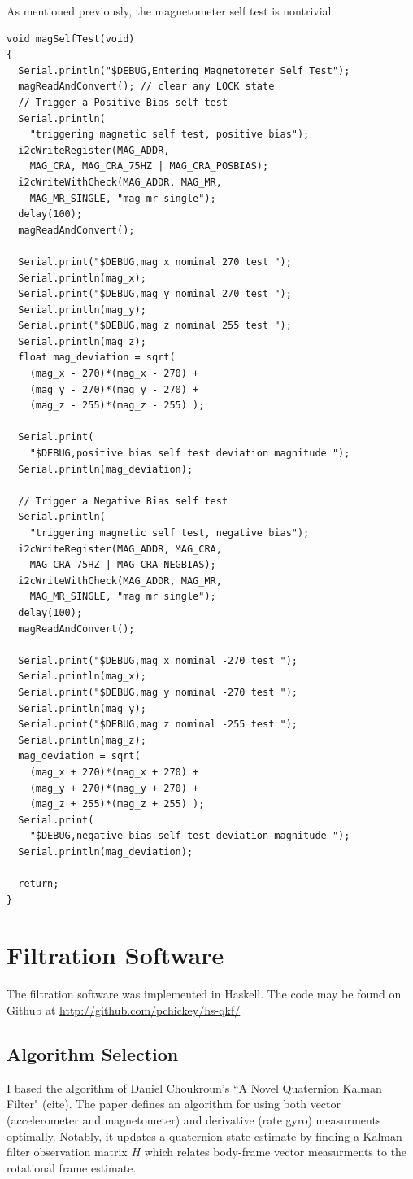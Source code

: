 \documentclass[12pt]{report}
\begin{document}
As mentioned previously, the magnetometer self test is nontrivial.
\begin{lstlisting}
void magSelfTest(void)
{
  Serial.println("$DEBUG,Entering Magnetometer Self Test");
  magReadAndConvert(); // clear any LOCK state
  // Trigger a Positive Bias self test
  Serial.println(
    "triggering magnetic self test, positive bias");
  i2cWriteRegister(MAG_ADDR, 
    MAG_CRA, MAG_CRA_75HZ | MAG_CRA_POSBIAS);
  i2cWriteWithCheck(MAG_ADDR, MAG_MR, 
    MAG_MR_SINGLE, "mag mr single");
  delay(100);
  magReadAndConvert();

  Serial.print("$DEBUG,mag x nominal 270 test ");
  Serial.println(mag_x);
  Serial.print("$DEBUG,mag y nominal 270 test ");
  Serial.println(mag_y);
  Serial.print("$DEBUG,mag z nominal 255 test ");
  Serial.println(mag_z);  
  float mag_deviation = sqrt( 
    (mag_x - 270)*(mag_x - 270) + 
    (mag_y - 270)*(mag_y - 270) +
    (mag_z - 255)*(mag_z - 255) );

  Serial.print(
    "$DEBUG,positive bias self test deviation magnitude ");
  Serial.println(mag_deviation);  

  // Trigger a Negative Bias self test
  Serial.println(
    "triggering magnetic self test, negative bias");
  i2cWriteRegister(MAG_ADDR, MAG_CRA, 
    MAG_CRA_75HZ | MAG_CRA_NEGBIAS);
  i2cWriteWithCheck(MAG_ADDR, MAG_MR, 
    MAG_MR_SINGLE, "mag mr single");
  delay(100);
  magReadAndConvert();

  Serial.print("$DEBUG,mag x nominal -270 test ");
  Serial.println(mag_x);
  Serial.print("$DEBUG,mag y nominal -270 test ");
  Serial.println(mag_y);
  Serial.print("$DEBUG,mag z nominal -255 test ");
  Serial.println(mag_z);
  mag_deviation = sqrt( 
    (mag_x + 270)*(mag_x + 270) + 
    (mag_y + 270)*(mag_y + 270) +
    (mag_z + 255)*(mag_z + 255) );
  Serial.print(
    "$DEBUG,negative bias self test deviation magnitude ");
  Serial.println(mag_deviation);  
  
  return;
}
\end{lstlisting}

\section{Filtration Software}
The filtration software was implemented in Haskell. The code may be found on Github at \url{http://github.com/pchickey/hs-qkf/}
\lstset{language=Haskell}
\subsection{Algorithm Selection}
I based the algorithm of Daniel Choukroun's ``A Novel Quaternion Kalman Filter" (cite). The paper defines an algorithm for using both vector (accelerometer and magnetometer) and derivative (rate gyro) measurments optimally. Notably, it updates a quaternion state estimate by finding a Kalman filter observation matrix $H$ which relates body-frame vector measurments to the rotational frame estimate.
\end{document}

